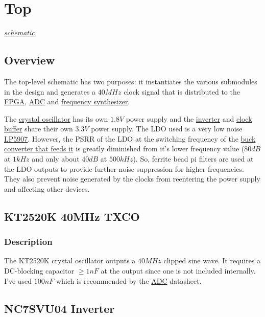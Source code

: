 \section{Top}
\label{sec:top}
\textit{\hyperlink{schematic.1}{schematic}}

\subsection{Overview}
\label{sec:top-overview}

The top-level schematic has two purposes: it instantiates the various submodules in the design and
generates a $40 \si{MHz}$ clock signal that is distributed to the
\hyperref[sec:xc7a15t-ftg256]{FPGA}, \hyperref[sec:ltc2292]{ADC} and
\hyperref[sec:adf4158]{frequency synthesizer}.

The \hyperref[sec:kt2520k]{crystal oscillator} has its own $1.8 \si{V}$ power supply and the
\hyperref[sec:nc7svu04]{inverter} and \hyperref[sec:nb3n551]{clock buffer} share their own
$3.3 \si{V}$ power supply. The LDO used is a very low noise \hyperref[sec:lp5907]{LP5907}. However,
the PSRR of the LDO at the switching frequency of the \hyperref[sec:tps5420d]{buck converter that
  feeds it} is greatly diminished from it's lower frequency value ($80 \si{dB}$ at $1 \si{kHz}$ and
only about $40 \si{dB}$ at $500 \si{kHz}$). So, ferrite bead pi filters are used at the LDO outputs
to provide further noise suppression for higher frequencies. They also prevent noise generated by
the clocks from reentering the power supply and affecting other devices.

\subsection{KT2520K 40MHz TXCO}
\label{sec:kt2520k}

\subsubsection{Description}
\label{sec:kt2520k-description}

The KT2520K crystal oscillator outputs a $40 \si{MHz}$ clipped sine wave. It requires a DC-blocking
capacitor $\geq 1 \si{nF}$ at the output since one is not included internally. I've used $100
\si{nF}$ which is recommended by the \hyperref[sec:ltc2292]{ADC} datasheet.

\subsection{NC7SVU04 Inverter}
\label{sec:nc7svu04}

